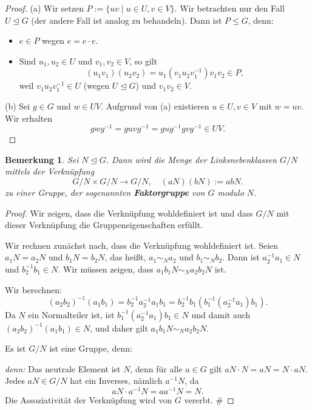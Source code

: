 \documentclass[a4paper, twoside, 11pt, ngerman]{report}
\theoremstyle{definistyle}
\newtheorem{bem}[satz]{Bemerkung}
\theoremstyle{remark}
\newenvironment{denn}%
  {\par\textit{denn:}}%
  {\hfill\#\par}
\newcommand{\defn}[1]{\textit{\bfseries #1}}
\begin{document}
\begin{proof}
(a) Wir setzen $P := \{uv \mid u \in U, v \in V\}$. Wir betrachten nur den Fall $U \trianglelefteq G$ (der andere Fall ist analog zu behandeln). Dann ist $P \leq G$, denn:
\begin{itemize}
    \item $e\in P$ wegen $e = e \cdot e$.
    \item Sind $u_1, u_2 \in U$ und $v_1, v_2 \in V$, so gilt
    \[
    (u_1 v_1)(u_2 v_2) = u_1 (v_1 u_2 v_1^{-1}) v_1 v_2 \in P,
    \]
    weil $v_1 u_2 v_1^{-1} \in U$ (wegen $U \trianglelefteq G$) und $v_1 v_2 \in V$.
\end{itemize}
(b) Sei $g\in G$ und $w\in UV$. Aufgrund von (a) existieren $u\in U,v\in V$ mit $w=uv$.
Wir erhalten
\[
gwg^{-1}=guvg^{-1}=gug^{-1}gvg^{-1}\in UV.
\]
\end{proof}

\begin{bem}\label{bem:definition_faktorgruppe}
Sei $N \trianglelefteq G$. Dann wird die Menge der Linksnebenklassen $G / N$ mittels der Verknüpfung
\[
G / N \times G / N \to G / N, \quad (aN)(bN) := abN.
\]
zu einer Gruppe, der sogenannten \defn{Faktorgruppe} von $G$ modulo $N$.
\end{bem}

\begin{proof}
Wir zeigen, dass die Verknüpfung wohldefiniert ist und dass $G / N$ mit dieser Verknüpfung die Gruppeneigenschaften erfüllt.

Wir rechnen zunächst nach, dass die Verknüpfung wohldefiniert ist. Seien $a_1N = a_2N$ und $b_1N = b_2N$, das heißt, $a_1 \sim_N a_2$ und $b_1 \sim_N b_2$. Dann ist $a_2^{-1} a_1 \in N$ und $b_2^{-1} b_1 \in N$. Wir müssen zeigen, dass $a_1 b_1 N \sim_N a_2 b_2 N$ ist.

Wir berechnen:
\[
(a_2 b_2)^{-1} (a_1 b_1) = b_2^{-1} a_2^{-1} a_1 b_1 = b_2^{-1} b_1 (b_1^{-1} (a_2^{-1} a_1) b_1).
\]
Da $N$ ein Normalteiler ist, ist $b_1^{-1} (a_2^{-1} a_1) b_1\in N$ und damit auch 
$(a_2 b_2)^{-1} (a_1 b_1) \in N $, und daher gilt $a_1 b_1 N \sim_N a_2 b_2 N$. 

Es ist $G / N$ ist eine Gruppe, denn:
\begin{denn}
Das neutrale Element ist $N$, denn für alle $a \in G$ gilt $aN \cdot N = aN = N \cdot aN$.
Jedes $aN \in G / N$ hat ein Inverses, nämlich $a^{-1}N$, da
    \[
    aN \cdot a^{-1}N = a a^{-1} N = N.
    \]
Die Assoziativität der Verknüpfung wird von $G$ vererbt.
\end{denn}
\end{proof}
\end{document}
